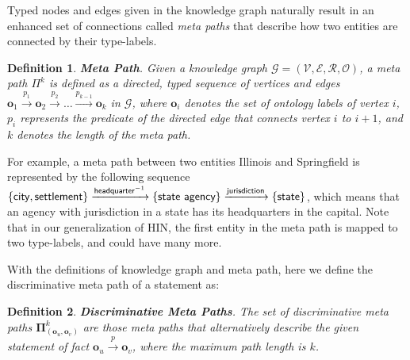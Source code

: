 \documentclass[reprint,twocolumn,showpacs,preprintnumbers,amsmath, aps,pre,amssymb]{revtex4-1}
\newtheorem{definition}{Definition}
\begin{document}
Typed nodes and edges given in the knowledge graph naturally result in an enhanced set of connections called \emph{meta paths} that describe how two entities are connected by their type-labels.

\begin{definition} \label{def:meta_path}
\textbf{Meta Path}. Given a knowledge graph $\mathcal{G}=(\mathcal{V},\mathcal{E},\mathcal{R},\mathcal{O})$, a meta path $\Pi^{k}$ is defined as a directed, typed sequence of vertices and edges $\mathbf{o}_1 \xrightarrow{p_1} \mathbf{o}_2 \xrightarrow{p_2} \ldots \xrightarrow{p_{k-1}} \mathbf{o}_k$ in $\mathcal{G}$, where $\mathbf{o}_i$ denotes the set of ontology labels of vertex $i$, $p_i$ represents the predicate of the directed edge that connects vertex $i$ to $i+1$, and $k$ denotes the length of the meta path.
\end{definition}


For example, a meta path between two entities \textsf{Illinois} and \textsf{Springfield} is represented by the following sequence $\{\textsf{city}, \textsf{settlement}\} \\ \xrightarrow {\textsf{headquarter}^{-1}} \{\textsf{state agency}\} \xrightarrow {\textsf{jurisdiction}} \{\textsf{state}\}$, which means that an agency with jurisdiction in a state has its headquarters in the capital. Note that in our generalization of HIN, the first entity in the meta path is mapped to two type-labels, and could have many more.

With the definitions of knowledge graph and meta path, here we define the discriminative meta path of a statement as:

\begin{definition} \label{def:discriminative_path}
\textbf{Discriminative Meta Paths}. The set of discriminative meta paths $\mathbf{\Pi}^k_{(\mathbf{o}_u,\mathbf{o}_v)}$ are those meta paths that alternatively describe the given statement of fact $\mathbf{o}_u\xrightarrow{p}\mathbf{o}_v$, where the maximum path length is $k$.%
\end{definition}  
\end{document}
